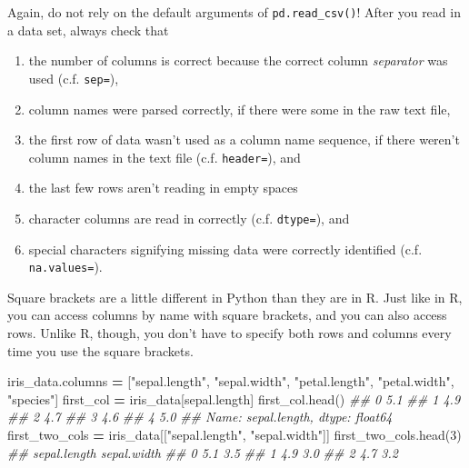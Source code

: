 \documentclass[
  12pt,
  krantz2]{krantz}
\makeatletter
\newenvironment{Shaded}{\begin{snugshade}}{\end{snugshade}}
\newcommand{\CommentTok}[1]{\textcolor[rgb]{0.37,0.37,0.37}{\textit{#1}}}
\newcommand{\DecValTok}[1]{\textcolor[rgb]{0.06,0.06,0.06}{#1}}
\newcommand{\NormalTok}[1]{#1}
\newcommand{\OperatorTok}[1]{\textcolor[rgb]{0.43,0.43,0.43}{\textbf{#1}}}
\newcommand{\StringTok}[1]{\textcolor[rgb]{0.5,0.5,0.5}{#1}}
\providecommand{\tightlist}{%
  \setlength{\itemsep}{0pt}\setlength{\parskip}{0pt}}
\newenvironment{kframe}{%
\medskip{}
\setlength{\fboxsep}{.8em}
 \def\at@end@of@kframe{}%
 \ifinner\ifhmode%
  \def\at@end@of@kframe{\end{minipage}}%
  \begin{minipage}{\columnwidth}%
 \fi\fi%
 \def\FrameCommand##1{\hskip\@totalleftmargin \hskip-\fboxsep
 \colorbox{shadecolor}{##1}\hskip-\fboxsep
     \hskip-\linewidth \hskip-\@totalleftmargin \hskip\columnwidth}%
 \MakeFramed {\advance\hsize-\width
   \@totalleftmargin\z@ \linewidth\hsize
   \@setminipage}}%
 {\par\unskip\endMakeFramed%
 \at@end@of@kframe}
\renewenvironment{Shaded}{\begin{kframe}}{\end{kframe}}
\makeatother
\begin{document}
\begin{rmd-caution}

Again, do not rely on the default arguments of \texttt{pd.read\_csv()}! After you read in a data set, always check that

\begin{enumerate}
\def\labelenumi{\arabic{enumi}.}
\tightlist
\item
  the number of columns is correct because the correct column \emph{separator} was used (c.f. \texttt{sep=}),
\item
  column names were parsed correctly, if there were some in the raw text file,
\item
  the first row of data wasn't used as a column name sequence, if there weren't column names in the text file (c.f. \texttt{header=}), and
\item
  the last few rows aren't reading in empty spaces
\item
  character columns are read in correctly (c.f. \texttt{dtype=}), and
\item
  special characters signifying missing data were correctly identified (c.f. \texttt{na.values=}).
\end{enumerate}

\end{rmd-caution}

Square brackets are a little different in Python than they are in R. Just like in R, you can access columns by name with square brackets, and you can also access rows. Unlike R, though, you don't have to specify both rows and columns every time you use the square brackets.

\begin{Shaded}
\begin{Highlighting}[]
\NormalTok{iris\_data.columns }\OperatorTok{=}\NormalTok{ [}\StringTok{"sepal.length"}\NormalTok{, }\StringTok{"sepal.width"}\NormalTok{, }\StringTok{"petal.length"}\NormalTok{, }
                      \StringTok{"petal.width"}\NormalTok{, }\StringTok{"species"}\NormalTok{]}
\NormalTok{first\_col }\OperatorTok{=}\NormalTok{ iris\_data[}\StringTok{\textquotesingle{}sepal.length\textquotesingle{}}\NormalTok{]}
\NormalTok{first\_col.head()}
\CommentTok{\#\# 0    5.1}
\CommentTok{\#\# 1    4.9}
\CommentTok{\#\# 2    4.7}
\CommentTok{\#\# 3    4.6}
\CommentTok{\#\# 4    5.0}
\CommentTok{\#\# Name: sepal.length, dtype: float64}
\NormalTok{first\_two\_cols }\OperatorTok{=}\NormalTok{ iris\_data[[}\StringTok{"sepal.length"}\NormalTok{, }\StringTok{"sepal.width"}\NormalTok{]]}
\NormalTok{first\_two\_cols.head(}\DecValTok{3}\NormalTok{)}
\CommentTok{\#\#    sepal.length  sepal.width}
\CommentTok{\#\# 0           5.1          3.5}
\CommentTok{\#\# 1           4.9          3.0}
\CommentTok{\#\# 2           4.7          3.2}
\end{Highlighting}
\end{Shaded}
\end{document}
